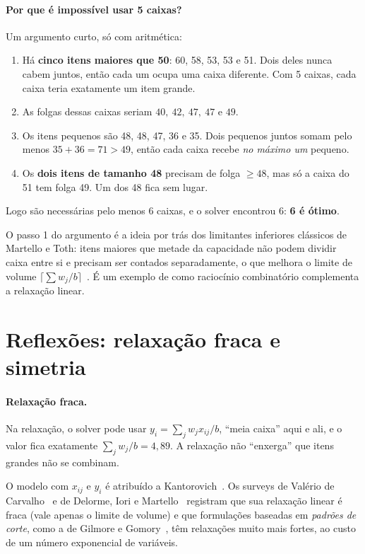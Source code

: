 \paragraph{Por que é impossível usar 5 caixas?} Um argumento curto, só com aritmética:
\begin{enumerate}
  \item Há \textbf{cinco itens maiores que 50}: 60, 58, 53, 53 e 51. Dois deles nunca cabem juntos, então cada um
  ocupa uma caixa diferente. Com 5 caixas, cada caixa teria exatamente um item grande.
  \item As folgas dessas caixas seriam $40,\ 42,\ 47,\ 47$ e $49$.
  \item Os itens pequenos são 48, 48, 47, 36 e 35. Dois pequenos juntos somam pelo menos $35+36=71>49$, então cada
  caixa recebe \emph{no máximo um} pequeno.
  \item Os \textbf{dois itens de tamanho 48} precisam de folga $\ge48$, mas só a caixa do 51 tem folga 49. Um dos 48
  fica sem lugar.
\end{enumerate}
Logo são necessárias pelo menos 6 caixas, e o solver encontrou 6: \textbf{6 é ótimo}.

\begin{outros}
O passo 1 do argumento é a ideia por trás dos limitantes inferiores clássicos de Martello e Toth: itens maiores que
metade da capacidade não podem dividir caixa entre si e precisam ser contados separadamente, o que melhora o limite
de volume $\lceil\sum w_j/b\rceil$~\cite{martellototh1990,delorme2016}. É um exemplo de como raciocínio
combinatório complementa a relaxação linear.
\end{outros}

\section{Reflexões: relaxação fraca e simetria}

\paragraph{Relaxação fraca.} Na relaxação, o solver pode usar $y_i=\sum_jw_jx_{ij}/b$, ``meia caixa'' aqui e ali, e
o valor fica exatamente $\sum_jw_j/b=4{,}89$. A relaxação não ``enxerga'' que itens grandes não se combinam.

\begin{outros}
O modelo com $x_{ij}$ e $y_i$ é atribuído a Kantorovich~\cite{kantorovich1960}. Os surveys de Valério de
Carvalho~\cite{carvalho2002} e de Delorme, Iori e Martello~\cite{delorme2016} registram que sua relaxação linear é
fraca (vale apenas o limite de volume) e que formulações baseadas em \emph{padrões de corte}, como a de Gilmore e
Gomory~\cite{gilmoregomory1961}, têm relaxações muito mais fortes, ao custo de um número exponencial de variáveis.
\end{outros}

